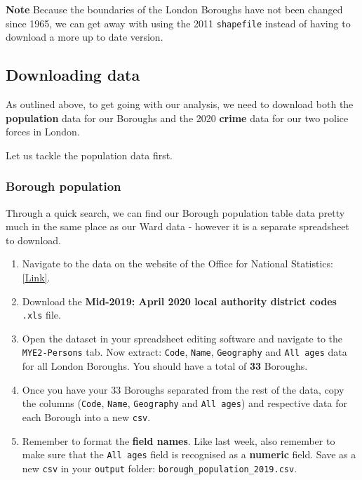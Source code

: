 \documentclass[
]{book}
\begin{document}
\textbf{Note}
Because the boundaries of the London Boroughs have not been changed since 1965, we can get away with using the 2011 \texttt{shapefile} instead of having to download a more up to date version.

\hypertarget{w03-downloading}{%
\subsection{Downloading data}\label{w03-downloading}}

As outlined above, to get going with our analysis, we need to download both the \textbf{population} data for our Boroughs and the 2020 \textbf{crime} data for our two police forces in London.

Let us tackle the population data first.

\hypertarget{borough-population}{%
\subsubsection{Borough population}\label{borough-population}}

Through a quick search, we can find our Borough population table data pretty much in the same place as our Ward data - however it is a separate spreadsheet to download.

\begin{enumerate}
\def\labelenumi{\arabic{enumi}.}
\item
  Navigate to the data on the website of the Office for National Statistics: \href{https://www.ons.gov.uk/peoplepopulationandcommunity/populationandmigration/populationestimates/datasets/populationestimatesforukenglandandwalesscotlandandnorthernireland}{{[}Link{]}}.
\item
  Download the \textbf{Mid-2019: April 2020 local authority district codes} \texttt{.xls} file.
\item
  Open the dataset in your spreadsheet editing software and navigate to the \texttt{MYE2-Persons} tab. Now extract: \texttt{Code}, \texttt{Name}, \texttt{Geography} and \texttt{All\ ages} data for all London Boroughs.
  You should have a total of \textbf{33} Boroughs.
\item
  Once you have your 33 Boroughs separated from the rest of the data, copy the columns (\texttt{Code}, \texttt{Name}, \texttt{Geography} and \texttt{All\ ages}) and respective data for each Borough into a new \texttt{csv}.
\item
  Remember to format the \textbf{field names}. Like last week, also remember to make sure that the \texttt{All\ ages} field is recognised as a \textbf{numeric} field. Save as a new \texttt{csv} in your \texttt{output} folder: \texttt{borough\_population\_2019.csv}.
\end{enumerate}
\end{document}
